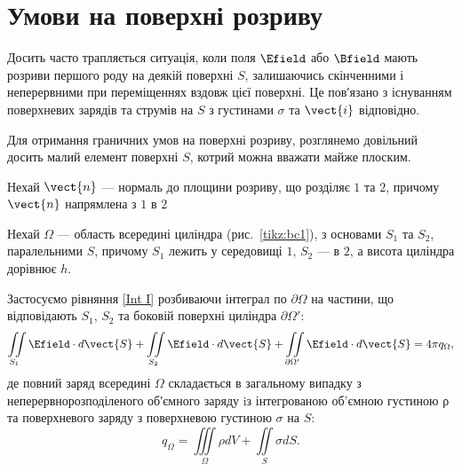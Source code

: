 \section{Умови на поверхні розриву}


Досить часто трапляється ситуація, коли поля $\Efield$ або $\Bfield$ мають розриви
першого роду на деякій поверхні $S$, залишаючись скінченними і неперервними
при переміщеннях вздовж цієї поверхні. Це пов′язано з існуванням
поверхневих зарядів та струмів на $S$ з густинами $\sigma$ та $\vect{i}$ відповідно.

Для отримання граничних умов на поверхні розриву, розглянемо довільний
досить малий елемент поверхні $S$, котрий можна вважати майже плоским.

Нехай $\vect{n}$ --- нормаль до площини розриву, що розділяє $1$ та $2$, причому
$\vect{n}$ напрямлена з $1$ в $2$

\begin{SCfigure}[0.5][h!]
	\centering
	\caption{До виведення першої граничної умови}%
	\label{tikz:bc1}
\end{SCfigure}

Нехай $\Omega$ --- область всередині циліндра
(рис.~\ref{tikz:bc1}), з основами $S_1$ та $S_2$,
паралельними $S$, причому $S_1$ лежить у
середовищі $1$, $S_2$ --- в $2$, а висота циліндра дорівнює $h$.

Застосуємо рівняння \eqref{Int I} розбиваючи інтеграл по $\partial\Omega$ на частини, що відповідають $S_1$, $S_2$ та боковій поверхні
циліндра $\partial\Omega'$:
\begin{equation*}
    	\iint\limits_{S_1} \Efield\cdot d\vect{S} +  \iint\limits_{S_2} \Efield\cdot d\vect{S} + \iint\limits_{\partial\Omega'} \Efield\cdot
    	d\vect{S} = 4\pi q_{\Omega},
\end{equation*}
де повний заряд всередині $\Omega$ складається в загальному випадку з неперервнорозподіленого об′ємного заряду iз інтегрованою об’ємною
густиною ρ та поверхневого заряду з поверхневою густиною $\sigma$ на $S$:
\begin{equation*}
    q_{\Omega} = \iiint\limits_{\Omega} \rho dV + \iint\limits_S \sigma dS.
\end{equation*}


